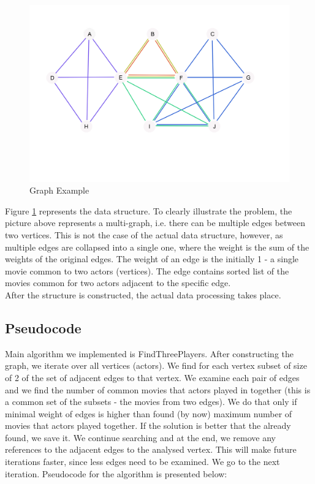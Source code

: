 \begin{figure}[ht!]
\centering
\includegraphics[width=130mm]{resources/project_problem_illustration.png}
\caption{Graph Example}
\label{example}
\end{figure}

Figure \ref{example} represents the data structure. To clearly illustrate the problem, the picture above represents a multi-graph, i.e. there can be multiple edges between two vertices. This is not the case of the actual data structure, however, as multiple edges are collapsed into a single one, where the weight is the sum of the weights of the original edges. The weight of an edge is the initially 1 - a single movie common to two actors (vertices). The edge contains sorted list of the movies common for two actors adjacent to the specific edge.
\\
After the structure is constructed, the actual data processing takes place.


\subsection{Pseudocode}
Main algorithm we implemented is FindThreePlayers. After constructing the graph, we iterate over all vertices (actors). We find for each vertex subset of size of 2 of the set of adjacent edges to that vertex. We examine each pair of edges and we find the number of common movies that actors played in together (this is a common set of the subsets - the movies from two edges).  We do that only if minimal weight of edges is higher than found (by now) maximum number of movies that actors played together. If the solution is better that the already found, we save it. We continue searching and at the end, we remove any references to the adjacent edges to the analysed vertex. This will make future iterations faster, since less edges need to be examined. We go to the next iteration. Pseudocode for the algorithm is presented below:

